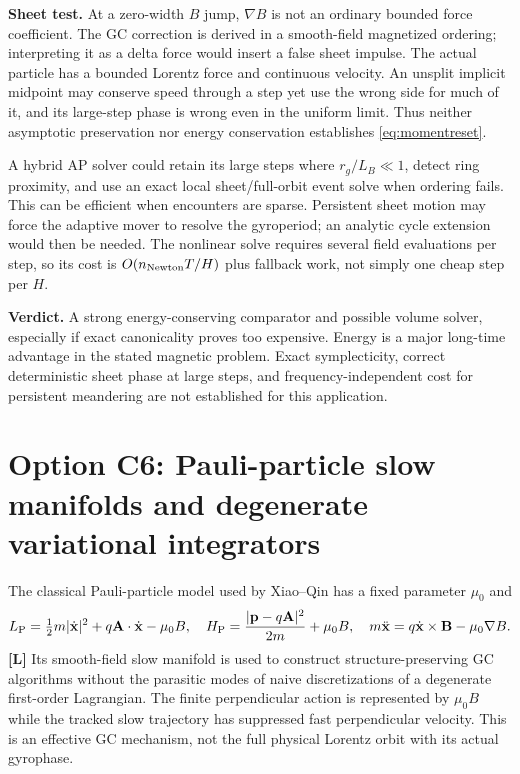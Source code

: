 \documentclass[10pt,a4paper]{article}
\newcommand{\B}{\mathbf B}\newcommand{\bunit}{\mathbf b}
\newcommand{\A}{\mathbf A}\newcommand{\dd}{\mathrm d}
\newcommand{\lit}{\textbf{[L]}}
\begin{document}
\textbf{Sheet test.} At a zero-width $B$ jump, $\nabla B$ is not an ordinary bounded force coefficient. The GC correction is derived in a smooth-field magnetized ordering; interpreting it as a delta force would insert a false sheet impulse. The actual particle has a bounded Lorentz force and continuous velocity. An unsplit implicit midpoint may conserve speed through a step yet use the wrong side for much of it, and its large-step phase is wrong even in the uniform limit. Thus neither asymptotic preservation nor energy conservation establishes \eqref{eq:momentreset}.

A hybrid AP solver could retain its large steps where $r_g/L_B\ll1$, detect ring proximity, and use an exact local sheet/full-orbit event solve when ordering fails. This can be efficient when encounters are sparse. Persistent sheet motion may force the adaptive mover to resolve the gyroperiod; an analytic cycle extension would then be needed. The nonlinear solve requires several field evaluations per step, so its cost is $O(n_{\rm Newton}T/H)$ plus fallback work, not simply one cheap step per $H$.

\textbf{Verdict.} A strong energy-conserving comparator and possible volume solver, especially if exact canonicality proves too expensive. Energy is a major long-time advantage in the stated magnetic problem. Exact symplecticity, correct deterministic sheet phase at large steps, and frequency-independent cost for persistent meandering are not established for this application.

\section{Option C6: Pauli-particle slow manifolds and degenerate variational integrators}
\label{sec:pauli}
The classical Pauli-particle model used by Xiao--Qin \cite{pauli} has a fixed parameter $\mu_0$ and
\begin{equation}\label{eq:pauli}
 L_{\rm P}=\tfrac12m|\dot\x|^2+q\A\cdot\dot\x-\mu_0 B,
 \quad H_{\rm P}=\frac{|\p-q\A|^2}{2m}+\mu_0 B,
 \quad m\ddot\x=q\dot\x\times\B-\mu_0\nabla B.
\end{equation}
\lit{} Its smooth-field slow manifold is used to construct structure-preserving GC algorithms without the parasitic modes of naive discretizations of a degenerate first-order Lagrangian. The finite perpendicular action is represented by $\mu_0 B$ while the tracked slow trajectory has suppressed fast perpendicular velocity. This is an effective GC mechanism, not the full physical Lorentz orbit with its actual gyrophase.
\end{document}
